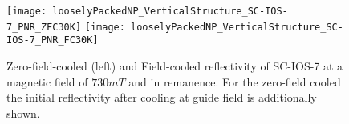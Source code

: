 \documentclass[\main/dresen_thesis.tex]{subfiles}
\begin{document}
  \begin{figure}[tb]
    \centering
    \texttt{[image: looselyPackedNP\_VerticalStructure\_SC-IOS-7\_PNR\_ZFC30K]}
    \texttt{[image: looselyPackedNP\_VerticalStructure\_SC-IOS-7\_PNR\_FC30K]}
    \caption{\label{fig:looselyPackedNP:layer:ZFCFCIOS7}Zero-field-cooled (left) and Field-cooled reflectivity of SC-IOS-7 at a magnetic field of $730 \unit{mT}$ and in remanence. For the zero-field cooled the initial reflectivity after cooling at guide field is additionally shown.}
  \end{figure}
\end{document}
